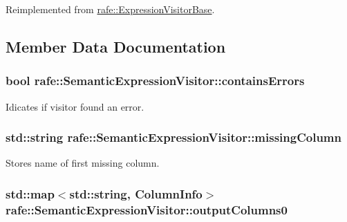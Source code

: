 Reimplemented from \hyperlink{classrafe_1_1_expression_visitor_base_a4eaa77bf4105d1cbdde4feb047228255}{rafe\+::\+Expression\+Visitor\+Base}.



\subsection{Member Data Documentation}
\hypertarget{classrafe_1_1_semantic_expression_visitor_aa72ce27912618ac925527b410b35d2d8}{
\subsubsection[{contains\+Errors}]{\setlength{\rightskip}{0pt plus 5cm}bool rafe\+::\+Semantic\+Expression\+Visitor\+::contains\+Errors}}\label{classrafe_1_1_semantic_expression_visitor_aa72ce27912618ac925527b410b35d2d8}
Idicates if visitor found an error. \hypertarget{classrafe_1_1_semantic_expression_visitor_ac50fe1acf73b917b780d2252d5ea1f69}{
\subsubsection[{missing\+Column}]{\setlength{\rightskip}{0pt plus 5cm}std\+::string rafe\+::\+Semantic\+Expression\+Visitor\+::missing\+Column}}\label{classrafe_1_1_semantic_expression_visitor_ac50fe1acf73b917b780d2252d5ea1f69}
Stores name of first missing column. \hypertarget{classrafe_1_1_semantic_expression_visitor_ae1fed8fcd45928b3a9479beb454f0b00}{
\subsubsection[{output\+Columns0}]{\setlength{\rightskip}{0pt plus 5cm}std\+::map$<$std\+::string, {\bf Column\+Info}$>$ rafe\+::\+Semantic\+Expression\+Visitor\+::output\+Columns0}}\label{classrafe_1_1_semantic_expression_visitor_ae1fed8fcd45928b3a9479beb454f0b00}
